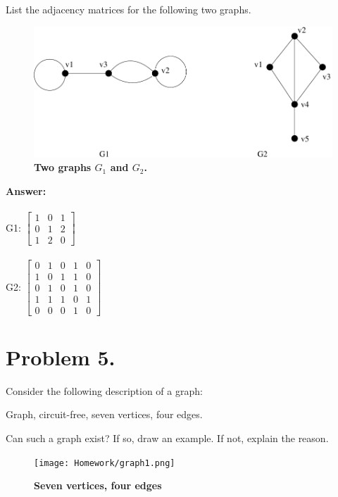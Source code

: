 \documentclass[11pt]{article}
\begin{document}
List the adjacency matrices for the following two graphs.
\newline

\begin{figure}[htbp]
\begin{center}
\includegraphics[scale=0.70]{fig1.pdf}
\end{center}
\label{fig1}
\caption{\bf Two graphs $G_1$ and $G_2$.}
\end{figure}
%
\noindent
{\bf Answer:}\\\\

G1:
$\begin{bmatrix}
1 & 0 & 1\\
0 & 1 & 2\\
1 & 2 & 0
\end{bmatrix}$\\\\

G2: 
$\begin{bmatrix}
0 & 1 & 0 & 1 & 0\\
1 & 0 & 1 & 1 & 0\\
0 & 1 & 0 & 1 & 0\\
1 & 1 & 1 & 0 & 1\\
0 & 0 & 0 & 1 & 0
\end{bmatrix}
$
\newline
\newpage

\section*{Problem 5.}

Consider the following description of a graph:
\newline

  Graph, circuit-free, seven vertices, four edges.
\newline

\noindent
Can such a graph exist? If so, draw an example. If not, explain the reason.
\newline
\newline
\newline
\newline

\begin{figure}[htbp]
\begin{center}
\texttt{[image: Homework/graph1.png]}
\end{center}
\label{fig2}
\caption{\bf Seven vertices, four edges}
\end{figure}
\end{document}
